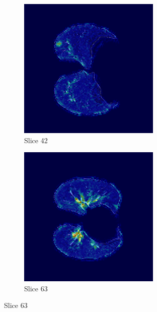 
\begin{figure}[!htbp]
\centering
\begin{subfigure}[b]{0.45\textwidth}
    \includegraphics[width=\textwidth]{img/label1_correcto_pred1_pid95HASH_slice_42.png}
    \caption{Slice 42}
\end{subfigure}
\hfill
\begin{subfigure}[b]{0.45\textwidth}
    \includegraphics[width=\textwidth]{img/label1_correcto_pred1_pid95HASH_slice_63.png}
    \caption{Slice 63}
\end{subfigure}


\end{figure}
